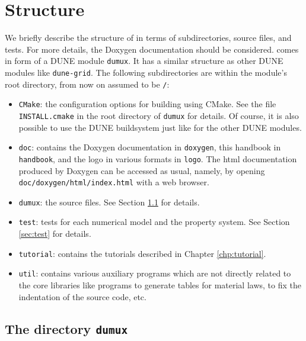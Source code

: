 \chapter{Structure}

We briefly describe the structure of \Dumux in terms 
of subdirectories, source files, and tests. For more details, 
the Doxygen documentation should be considered. 
\Dumux comes in form of a DUNE module \texttt{dumux}. 
It has a similar structure as other DUNE modules like \texttt{dune-grid}. 
The following subdirectories are within the module's root directory, 
from now on assumed to be \texttt{/}: 
\begin{itemize} 
\item \texttt{CMake}: the configuration options 
for building \Dumux using CMake. See the file \texttt{INSTALL.cmake} in 
the root directory of \texttt{dumux} for details. Of course, 
it is also possible to use the DUNE buildsystem just like for the other 
DUNE modules.
\item \texttt{doc}: contains the Doxygen documentation in \texttt{doxygen}, 
this handbook in \texttt{handbook}, and the \Dumux logo in various formats in 
\texttt{logo}. The html documentation produced by Doxygen can be accessed as usual, 
namely, by opening \texttt{doc/doxygen/html/index.html} with a web browser. 
\item \texttt{dumux}: the \Dumux source files. See Section \ref{sec:dumux} for details. 
\item \texttt{test}: tests for each numerical model and the property system. 
See Section \ref{sec:test} for details. 
\item \texttt{tutorial}: contains the tutorials described in Chapter \ref{chp:tutorial}. 
\item \texttt{util}:   contains various auxiliary programs which are not
directly related to the core \Dumux libraries like programs to generate
tables for material laws, to fix the indentation of the source code,
etc.
\end{itemize}



\section{The directory \texttt{dumux}}\label{sec:dumux}

